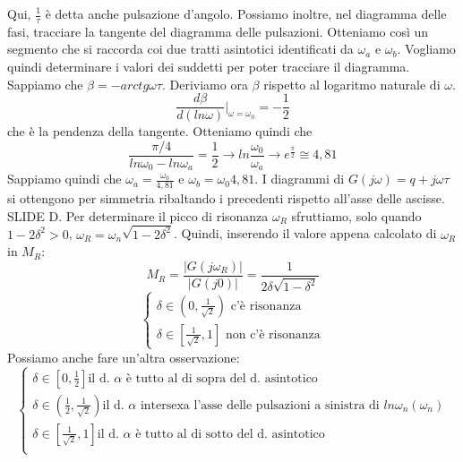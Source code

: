 \documentclass[11pt]{article}
\begin{document}
Qui, $\frac{1}{\tau}$ è detta anche pulsazione d'angolo. Possiamo inoltre, nel diagramma delle fasi, tracciare la tangente del diagramma delle pulsazioni. Otteniamo così un segmento che si raccorda coi due tratti asintotici identificati da $\omega_a$ e $\omega_b$. Vogliamo quindi determinare i valori dei suddetti per poter tracciare il diagramma.
Sappiamo che $\beta = -arctg \omega \tau$. Deriviamo ora $\beta$ rispetto al logaritmo naturale di $\omega$.
\begin{displaymath}
    \frac{d\beta}{d(ln\omega)}|_{\omega=\omega_0} = -\frac{1}{2}
\end{displaymath}
che è la pendenza della tangente. Otteniamo quindi che
\begin{displaymath}
    \frac{\pi/4}{ln\omega_0-ln\omega_a}=\frac{1}{2} \rightarrow ln\frac{\omega_0}{\omega_a} \rightarrow e^{\frac{\pi}{2}} \cong 4,81
\end{displaymath}
Sappiamo quindi che $\omega_a = \frac{\omega_0}{4,81}$ e $\omega_b = \omega_0 4,81$. I diagrammi di $G(j\omega) = q+j\omega\tau$ si ottengono per simmetria ribaltando i precedenti rispetto all'asse delle ascisse.
SLIDE D.
Per determinare il picco di risonanza $\omega_R$ sfruttiamo, solo quando $1-2\delta^2 >0$, $\omega_R = \omega_n\sqrt{1-2\delta^2}$. Quindi, inserendo il valore appena calcolato di $\omega_R$ in $M_R$:
\begin{displaymath}
    M_R = \frac{|G(j\omega_R)|}{|G(j0)|} = \frac{1}{2\delta\sqrt{1-\delta^2}}
\end{displaymath}
\begin{displaymath}
    \begin{cases}
        \delta \in \left(0,\frac{1}{\sqrt{2}}\right) \textrm{ c'è risonanza} \\
        \delta \in \left[\frac{1}{\sqrt{2}},1\right] \textrm{ non c'è risonanza}
    \end{cases}
\end{displaymath}
Possiamo anche fare un'altra osservazione:
\begin{displaymath}
    \begin{cases}
        \delta \in \left[0,\frac{1}{2}\right] \textrm{il d. }\alpha\textrm{ è tutto al di sopra del d. asintotico}                                                 \\
        \delta \in \left(\frac{1}{2},\frac{1}{\sqrt{2}}\right) \textrm{il d. }\alpha\textrm{ intersexa l'asse delle pulsazioni a sinistra di }ln\omega_n(\omega_n) \\
        \delta \in \left[\frac{1}{\sqrt{2}},1\right] \textrm{il d. }\alpha\textrm{ è tutto al di sotto del d. asintotico}                                          \\
    \end{cases}
\end{displaymath}
\end{document}
